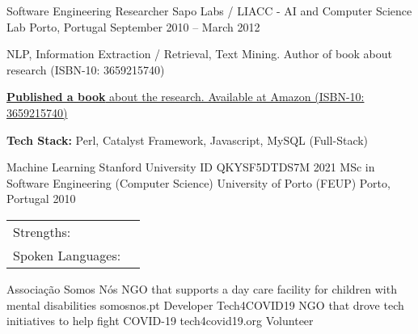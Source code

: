 \documentclass[]{awesome-cv}
\begin{document}
\begin{cventries}
	\vspace{-4mm}
	\cventry
	{Software Engineering Researcher}
	{Sapo Labs / LIACC - AI and Computer Science Lab}
	{Porto, Portugal}
	{September 2010 – March 2012}
	{\begin{cvitems}
		\item {NLP, Information Extraction / Retrieval, Text Mining. Author of book about research (ISBN-10: 3659215740)}
		\item {\href{https://www.amazon.com/Automatic-Extraction-of-Biographical-Data/dp/3659215740}{\textbf{Published a book} about the research. Available at Amazon (ISBN-10: 3659215740)}}
		\item {\textbf{Tech Stack:} Perl, Catalyst Framework, Javascript, MySQL (Full-Stack)}
		\end{cvitems}}
\end{cventries}
\vspace{-5mm}

\vspace{-3mm}
\begin{cvhonors}
	\cvhonor
	{Machine Learning}
	{Stanford University}
	{ID QKYSF5DTDS7M}
	{2021}
	\cvhonor
	{MSc in Software Engineering (Computer Science)}
	{University of Porto (FEUP)}
	{Porto, Portugal}
	{2010}
\end{cvhonors}

\vspace{-3mm}
\begin{cventries}
	\vspace{-2mm}
	\cventry
	{}
	{\def\arraystretch{1.15}{\begin{tabular}{ l l }
		Strengths:  & {\skill{ Leadership, Coaching, Self-Motivation, Problem Solver, Outside-the-box Thinking, Builder, Empowering \& Motivating others }} \\
		Spoken Languages:  & {\skill{ English, Portuguese, French, Spanish, Slovene}} \\
		\end{tabular}}}
	{}
	{}
	{}
\end{cventries}

\vspace{-11mm}

\vspace{-3mm}

\begin{cvhonors}
	\cvhonor
	{Associação Somos Nós}
	{NGO that supports a day care facility for children with mental disabilities}
	{somosnos.pt}
	{Developer}
	\cvhonor
	{Tech4COVID19}
	{NGO that drove tech initiatives to help fight COVID-19}
	{tech4covid19.org}
	{Volunteer}
\end{cvhonors}
\
\end{document}
